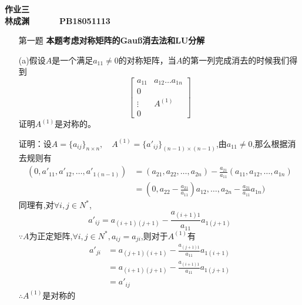 \documentclass[12pt,a4paper,utf8]{ctexart}
\begin{document}


\begin{center}
\textbf{作业三}\\
\textbf{林成渊 ~~~~~ PB18051113 ~~~~~ \zhtoday}\\
\end{center}
\textit{}
\vspace{\baselineskip}

\begin{enumerate}
\item[第一题] \textbf{本题考虑对称矩阵的Gauß消去法和LU分解}

(a)假设$ A $是一个满足$ a_11 \neq 0 $的对称矩阵，当$ A $的第一列完成消去的时候我们得到
\begin{equation}
	\left[\begin{matrix}
		a_{11} & a_{12}\dots a_{1n} \\
		0 &  \\
		\vdots & A^{(1)}\\
		0 & 
	\end{matrix}\right] \nonumber
\end{equation}
证明$ A^{(1)} $是对称的。

证明：设$ A = \{a_{ij}\}_{n\times n} ,\quad A^{(1)} = \{a'_{ij}\}_{(n-1)\times (n-1)}$,由$ a_11 \neq 0 $,那么根据消去规则有
\begin{equation}
	\begin{aligned}
		(0,a'_{11},a'_{12},\dots ,a'_{1(n-1)}) &= (a_{21},a_{22},\dots ,a_{2n}) - \frac{a_{21}}{a_{11}} (a_{11},a_{12},\dots , a_{1n}) \\
			&= (0,a_{22} - \frac{a_{21}}{a_{11}})a_{12},\dots ,a_{2n} - \frac{a_{21}}{a_{11}} a_{1n})
	\end{aligned}
	\nonumber
\end{equation}
同理有,对$ \forall i,j \in N^* $,
\begin{equation}
	a'_{ij} = a_{(i+1)(j+1)} - \frac{a_{(i+1)1}}{a_{11}}a_{1(j+1)} \nonumber
\end{equation}
$ \because A$为正定矩阵,$ \forall i,j \in N^*, a_{ij} = a_{ji} $,则对于$ A^{(1)} $有
\begin{equation}
	\begin{aligned}
		a'_{ji} &= a_{(j+1)(i+1)} - \frac{a_{(j+1)1}}{a_{11}} a_{1(i+1)} \\
				&= a_{(i+1)(j+1)} - \frac{a_{(i+1)1}}{a_{11}} a_{1(j+1)} \\
				&= a'_{ij}
	\end{aligned}
	\nonumber
\end{equation}
$ \therefore A^{(1)}$是对称的




\end{enumerate}
\end{document}
